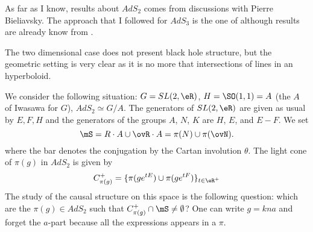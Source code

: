 As far as I know, results about $AdS_2$ comes from discussions with Pierre Bieliavsky. The approach that I followed for $AdS_3$ is the one of \cite{BTZB_un,BTZB_deux} although results are already know from \cite{BTZ_un,BTZ_deux}.

The two dimensional case does not present black hole structure, but the geometric setting is very clear as it is no more that intersections of lines in an hyperboloid.

We consider the following situation: $G=SL(2,\eR)$, $H=\SO(1,1)=A$ (the $A$ of Iwasawa for $G$), $AdS_2\simeq G/A$. The generators of $SL(2,\eR)$ are given as usual by $E,F,H$ and the generators of the groups $A$, $N$, $K$ are $H$, $E$, and $E-F$. We set
\[
	\mS=R\cdot A\cup \ovR\cdot A=\pi(N)\cup\pi(\ovN).
\]
where the bar denotes the conjugation by the Cartan involution $\theta$. The light cone of $\pi(g)$ in $AdS_2$ is given by
\begin{equation}
	C^+_{\pi(g)}=\{ \pi(ge^{tE})\cup\pi(ge^{tF}) \}_{t\in\eR^+}
\end{equation}
The study of the causal structure on this space is the following question: which are the $\pi(g)\in AdS_2$ such that $C^+_{\pi(g)}\cap\mS\neq \emptyset$? One can write $g=kna$ and forget the $a$-part because all the expressions appears in a $\pi$.

